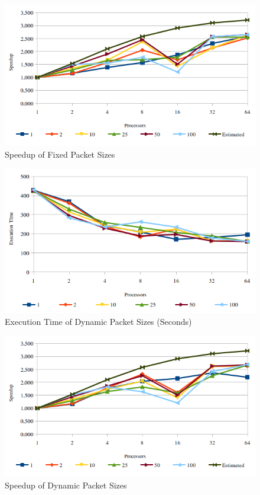 \documentclass{article}
\begin{document}
  \begin{figure}[H]
    \caption{Speedup of Fixed Packet Sizes}
    \label{fig:fixedspeedup}
    \centering

    \includegraphics[scale=0.5]{fixedspeedup}
  \end{figure}

  \begin{figure}[H]
    \caption{Execution Time of Dynamic Packet Sizes (Seconds)}
    \label{fig:dynexectime}
    \centering

    \includegraphics[scale=0.5]{dynexec}
  \end{figure}

  \begin{figure}[H]
    \caption{Speedup of Dynamic Packet Sizes}
    \label{fig:dynspeedup}
    \centering

    \includegraphics[scale=0.5]{dynspeedup}
  \end{figure}
\end{document}
